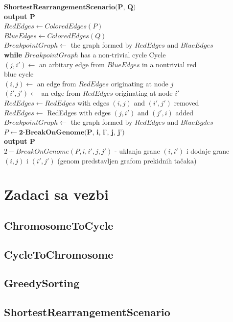 \noindent $\textbf{ShortestRearrangementScenario(P, Q)}$\\
\indent \textbf{output P}\\
\indent $RedEdges \leftarrow ColoredEdges(P)$\\
\indent $BlueEdges \leftarrow ColoredEdges(Q)$\\
\indent $BreakpointGraph \leftarrow$ the graph formed by $RedEdges$ and $BlueEdges$\\
\indent \textbf{while} \hspace{0.2cm} $BreakpointGraph$ has a non-trivial cycle Cycle\\
\indent \indent $(j, i') \leftarrow$ an arbitary edge from $BlueEdges$ in a nontrivial red \\
\indent \indent blue cycle\\
\indent \indent $(i, j) \leftarrow$ an edge from $RedEdges$ originating  at node $j$\\
\indent \indent $(i', j') \leftarrow$ an edge from $RedEdges$ originating at node $i'$\\
\indent \indent $RedEdges \leftarrow RedEdges$ with edges $(i, j)$ and $(i', j')$ removed\\
\indent \indent $RedEdges \leftarrow$ RedEdges with edges $(j, i')$ and $(j', i)$ added\\
\indent \indent $BreakpointGraph \leftarrow$ the graph formed by $RedEdges$ and $BlueEgdes$\\
\indent \indent $P \leftarrow \textbf{2-BreakOnGenome(P, i, i', j, j')}$\\
\indent \indent \textbf{output P}\\

\noindent $2-BreakOnGenome(P, i, i', j, j')$ - uklanja grane $(i, i')$ i dodaje grane $(i, j)$ i $(i', j')$ (genom predstavljen grafom prekidnih tačaka)

\newpage

\section{Zadaci sa vezbi}

\setexamplecodestyle
\subsection{ChromosomeToCycle}


\subsection{CycleToChromosome}


\subsection{GreedySorting}


\subsection{ShortestRearrangementScenario}


